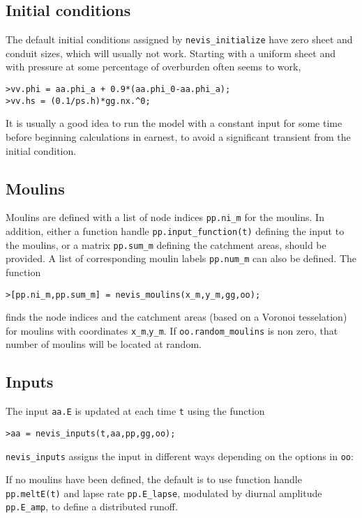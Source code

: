 \documentclass[a4paper,11pt,fleqn]{article}
\begin{document}
{{\subsection*{Initial conditions}

The default initial conditions assigned by \verb|nevis_initialize| have zero sheet and conduit sizes, which will usually not work.  Starting with a uniform sheet and with pressure at some percentage of overburden often seems to work,
\begin{verbatim}
>vv.phi = aa.phi_a + 0.9*(aa.phi_0-aa.phi_a);
>vv.hs = (0.1/ps.h)*gg.nx.^0;
\end{verbatim} 
It is usually a good idea to run the model with a constant input for some time before beginning calculations in earnest, to avoid a significant transient from the initial condition.

\subsection*{Moulins}

Moulins are defined with a list of node indices \verb|pp.ni_m| for the moulins.  In addition, either a function handle \verb|pp.input_function(t)| defining the input to the moulins, or a matrix \verb|pp.sum_m| defining the catchment areas, should be provided.  A list of corresponding moulin labels \verb|pp.num_m| can also be defined.  The function 
\begin{verbatim}
>[pp.ni_m,pp.sum_m] = nevis_moulins(x_m,y_m,gg,oo);
\end{verbatim}
finds the node indices and the catchment areas (based on a Voronoi tesselation) for moulins with coordinates \verb|x_m|,\verb|y_m|.  If \verb|oo.random_moulins| is non zero, that number of moulins will be located at random.


\subsection*{Inputs}

The input \verb|aa.E| is updated at each time \verb|t| using the function
\begin{verbatim}
>aa = nevis_inputs(t,aa,pp,gg,oo);
\end{verbatim}
\verb|nevis_inputs| assigns the input in different ways depending on the options in \verb|oo|:

If no moulins have been defined, the default is to use function handle \verb|pp.meltE(t)| and lapse rate \verb|pp.E_lapse|, modulated by diurnal amplitude \verb|pp.E_amp|, to define a distributed runoff.

}}
\end{document}

